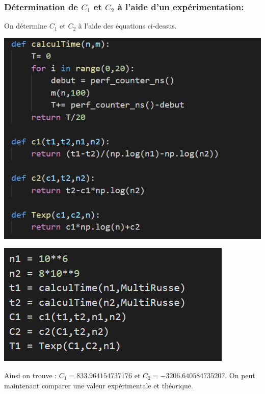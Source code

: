 \documentclass[12pt,a4paper]{report}
\begin{document}
\begin{flushleft}
\subsubsection{Détermination de $C_{1}$ et $C_{2}$ à l'aide d'un expérimentation:}
On détermine $C_{1}$ et $C_{2}$ à l'aide des équations ci-dessus.
\begin{center}
\begin{minipage}{0.48\linewidth}
\includegraphics[width=\linewidth]{ProgC1C2}
\end{minipage}%
\hfill
\begin{minipage}{0.49\linewidth}
\includegraphics[width=\linewidth]{DeterC1C2}
\end{minipage}
\end{center}
Ainsi on trouve : $C_{1} = 833.964154737176$ et $C_{2} = -3206.640584735207 $. On peut maintenant comparer une valeur expérimentale et théorique.

\end{flushleft}
\end{document}
